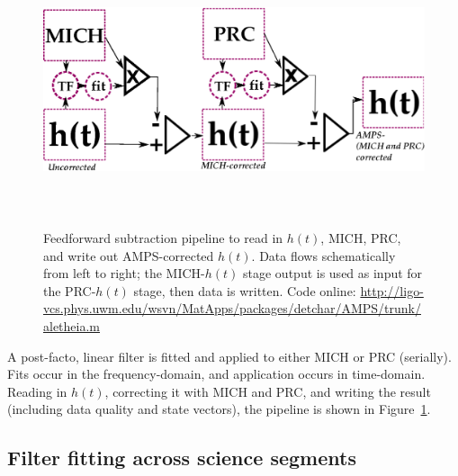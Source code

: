 \begin{figure}
\begin{center}
\includegraphics[height=80mm,width=150mm]{figure9.eps}
\caption{Feedforward subtraction pipeline to read in $h(t)$, MICH, PRC, and write out AMPS-corrected $h(t)$. Data flows schematically from left to right; the MICH-$h(t)$ stage output is used as input for the PRC-$h(t)$ stage, then data is written. Code online: \url{http://ligo-vcs.phys.uwm.edu/wsvn/MatApps/packages/detchar/AMPS/trunk/aletheia.m}
}
\label{pipelineGraph}
\end{center}
\end{figure}    

A post-facto, linear filter is fitted and applied to either MICH or PRC (serially). Fits occur in the frequency-domain, and application occurs in time-domain. Reading in $h(t)$, correcting it with MICH and PRC, and writing the result (including data quality and state vectors), the pipeline is shown in Figure~\ref{pipelineGraph}. 


        \subsection{Filter fitting across science segments}
        \label{filter_fitting-out-of-loop}

